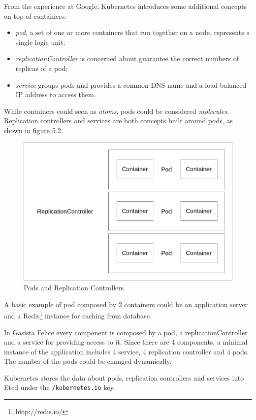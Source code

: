 From the experience at Google, Kubernetes introduces some additional concepts on top of containers:
\begin{itemize}
\item \textit{pod}, a set of one or more containers that run together on a node, represents a single logic unit;
\item \textit{replicationController} is concerned about guarantee the correct numbers of replicas of a pod;
\item \textit{service} groups pods and provides a common DNS name and a load-balanced IP address to access them.
\end{itemize}

While containers could seen as \textit{atoms}, pods could be considered \textit{molecules}.  Replication controllers and services are both concepts built around pods, as shown in figure 5.2.

\begin{figure}[htbp]
\centering
\includegraphics{media/ch5-pods-rcs.png}
\caption{Pods and Replication Controllers}
\end{figure}

A basic example of pod composed by 2 containers could be an application server and a Redis\footnote{http://redis.io/} instance for caching from database.

In Gasista Felice every component is composed by a pod, a replicationController and a service for providing access to it.  Since there are 4 components, a minimal instance of the application includes 4 service, 4 replication controller and 4 pods.  The number of the pods could be changed dynamically.

Kubernetes stores the data about pods, replication controllers and services into Etcd under the \texttt{/kubernetes.io} key.

